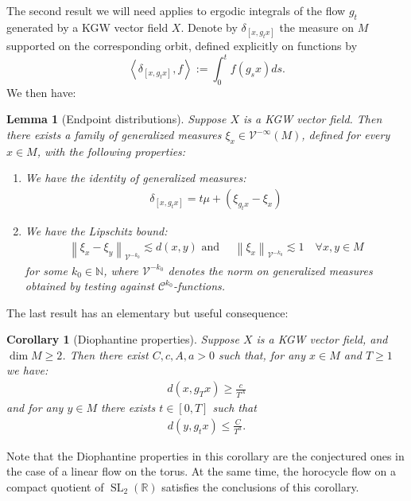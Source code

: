 \documentclass[11pt]{amsart}
\newcommand \cC {\mathcal{C}}
\newcommand \cV {\mathcal{V}}
\newcommand \bN {\mathbb{N}}
\newcommand \bR {\mathbb{R}}
\newcommand{\ip}[1]{\left\langle#1\right\rangle}
\newcommand{\leqapprox}{\lesssim}
\newcommand{\norm}[1]{\left\|#1\right\|}
\newcommand{\SL}{\operatorname{SL}}
\theoremstyle{mytheoremstyle}
\theoremstyle{mydefinitionstyle}
\theoremstyle{mytheoremstyle}
\numberwithin{equation}{section}
\newtheorem{lemma}[lemma]{Lemma}
\newtheorem{corollary}[corollary]{Corollary}
\theoremstyle{mydefinitionstyle}
\begin{document}
The second result we will need applies to ergodic integrals of the flow $g_t$ generated by a KGW vector field $X$.
Denote by $\delta_{[x,g_tx]}$ the measure on $M$ supported on the corresponding orbit, defined explicitly on functions by
\[
	\ip{\delta_{[x,g_tx]},f}:=\int_{0}^t f(g_s x)ds.
\]
We then have:
\begin{lemma}[Endpoint distributions]
	\label{lemma:Endpoint-distributions}
	Suppose $X$ is a KGW vector field.
	Then there exists a family of generalized measures $\xi_x\in \cV^{-\infty}(M)$, defined for every $x\in M$, with the following properties:
	\begin{enumerate}
		\item We have the identity of generalized measures:
		\begin{align}
			\label{eqn:distribution-orbit-identity}
			\delta_{[x,g_tx]} = t \mu + (\xi_{g_tx}-\xi_x)
		\end{align}
		\item We have the Lipschitz bound:
		\begin{align}
			\label{eqn:Lipschitz-bound-xi}
			\norm{\xi_x-\xi_y}_{\cV^{-k_0}} \leqapprox d(x,y)
			\text{ and }
			\quad \norm{\xi_x}_{\cV^{-k_0}} \leqapprox 1
			\quad \forall x,y\in M
		\end{align}
		for some $k_0\in \bN$, where $\cV^{-k_0}$ denotes the norm on generalized measures obtained by testing against $\cC^{k_0}$-functions.
	\end{enumerate}
\end{lemma}

The last result has an elementary but useful consequence:

\begin{corollary}[Diophantine properties]
	\label{cor:diophantine_properties}
	Suppose $X$ is a KGW vector field, and $\dim M\geq 2$.
	Then there exist $C,c,A,a>0$ such that, for any $x\in M$ and $T\geq 1$ we have:
	\begin{align}
		\label{eqn:Diophantine_repulsion}
		d(x,g_Tx) \geq \frac{c}{T^{A}}
	\end{align}
	and for any $y\in M$ there exists $t\in [0,T]$ such that
	\begin{align}
		\label{eqn:Diophantine_equidistribution}
		d(y,g_t x) \leq \frac{C}{T^{a}}.
	\end{align}	
\end{corollary}
Note that the Diophantine properties in this corollary are the conjectured ones in the case of a linear flow on the torus.
At the same time, the horocycle flow on a compact quotient of $\SL_2(\bR)$ satisfies the conclusions of this corollary.
\end{document}
